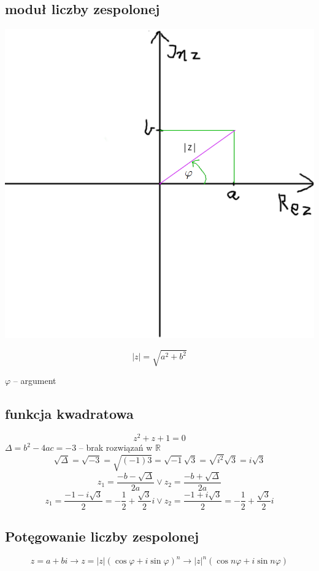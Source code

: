 \documentclass[11pt]{article}
\begin{document}
\subsection{moduł liczby zespolonej}
\label{sec:orgbe55af4}

\begin{center}
\includegraphics[width=.9\linewidth]{lzespolona.png}
\end{center}

$$|z|=\sqrt{a^2+b^2}$$

\(\varphi\) -- argument

\subsection{funkcja kwadratowa}
\label{sec:org3e30075}
$$z^2+z+1=0$$
\(\Delta = b^2-4ac = -3\) -- brak rozwiązań w \(\mathbb{R}\)
$$\sqrt{\Delta} = \sqrt{-3} = \sqrt{(-1)3} = \sqrt{-1}  \sqrt{3} = \sqrt{i^2}\sqrt{3} = i \sqrt{3} $$
$$z_1 = \frac{-b - \sqrt{\Delta} }{2a} \lor z_2=\frac{-b + \sqrt{\Delta} }{2a}$$
$$z_1 = \frac{-1-i\sqrt{3}}{2} = -\frac{1}{2} + \frac{\sqrt{3}}{2}i \lor
z_2 = \frac{-1 + i\sqrt{3}}{2} = - \frac{1}{2}+ \frac{\sqrt{3}}{2}i $$
\subsection{Potęgowanie liczby zespolonej}
\label{sec:org495b718}
$$z=a+bi \to z=|z|(\cos \varphi + i \sin \varphi)^n \to |z|^n(\cos n \varphi + i \sin n \varphi)$$
\end{document}
